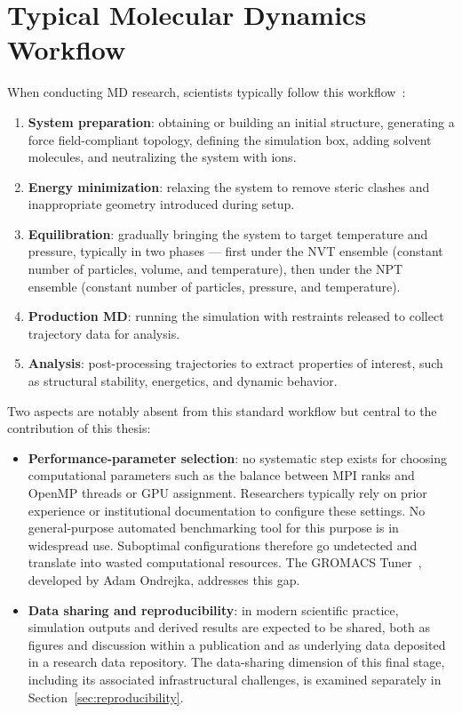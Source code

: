 \documentclass[
  digital,     %
  color,       %
  oneside,     %
  nosansbold,  %
  nocolorbold, %
  lof,         %
  lot,         %
]{fithesis4}
\begin{document}
\section{Typical Molecular Dynamics Workflow}
\label{sec:md_workflow}

When conducting MD research, scientists typically follow this workflow~\cite{gmx_workflow}:

\begin{enumerate}
    \item \textbf{System preparation}: obtaining or building an initial structure, generating a force field-compliant topology, defining the simulation box, adding solvent molecules, and neutralizing the system with ions.
    \item \textbf{Energy minimization}: relaxing the system to remove steric clashes and inappropriate geometry introduced during setup.
    \item \textbf{Equilibration}: gradually bringing the system to target temperature and pressure, typically in two phases --- first under the NVT ensemble (constant number of particles, volume, and temperature), then under the NPT ensemble (constant number of particles, pressure, and temperature).
    \item \textbf{Production MD}: running the simulation with restraints released to collect trajectory data for analysis.
    \item \textbf{Analysis}: post-processing trajectories to extract properties of interest, such as structural stability, energetics, and dynamic behavior.
\end{enumerate}

Two aspects are notably absent from this standard workflow but central to the contribution of this thesis:

\begin{itemize}
    \item \textbf{Performance-parameter selection}: no systematic step exists for choosing computational parameters such as the balance between MPI ranks and OpenMP threads or GPU assignment. Researchers typically rely on prior experience or institutional documentation to configure these settings. No general-purpose automated benchmarking tool for this purpose is in widespread use. Suboptimal configurations therefore go undetected and translate into wasted computational resources. The GROMACS Tuner~\cite{gromacs_tuner}, developed by Adam Ondrejka, addresses this gap.
    \item \textbf{Data sharing and reproducibility}: in modern scientific practice, simulation outputs and derived results are expected to be shared, both as figures and discussion within a publication and as underlying data deposited in a research data repository. The data-sharing dimension of this final stage, including its associated infrastructural challenges, is examined separately in Section~\ref{sec:reproducibility}.
\end{itemize}
\end{document}
